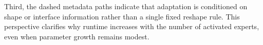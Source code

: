 



Third, the dashed metadata paths indicate that adaptation is conditioned on shape or interface information rather than a single fixed reshape rule. This perspective clarifies why runtime increases with the number of activated experts, even when parameter growth remains modest.

